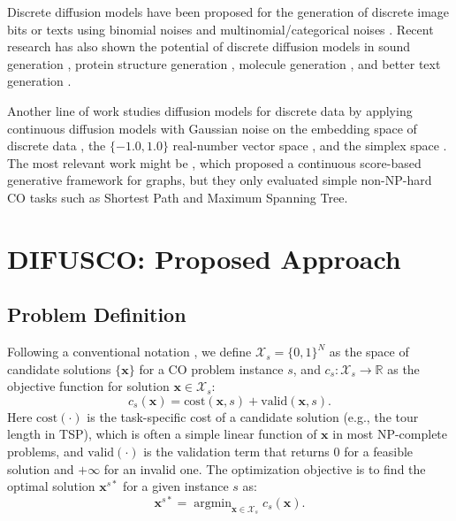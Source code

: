 \documentclass{article}
\theoremstyle{plain}
\theoremstyle{definition}
\theoremstyle{remark}
\newcommand{\method}{DIFUSCO}
\DeclareMathOperator*{\argmin}{argmin}
\newcommand\CAL\mathcal
\begin{document}
Discrete diffusion models have been proposed for the generation of discrete image bits or texts using binomial noises \citep{sohl2015deep} and multinomial/categorical noises \citep{austin2021structured,hoogeboom2021argmax}.
Recent research has also shown the potential of discrete diffusion models in sound generation \citep{yang2022diffsound}, protein structure generation \citep{luo2022antigenspecific}, molecule generation \citep{vignac2022digress}, and better text generation \citep{johnson2021beyond,he2022diffusionbert}.

Another line of work studies diffusion models for discrete data by applying continuous diffusion models with Gaussian noise on the embedding space of discrete data \citep{gong2022diffuseq,li2022diffusionlm,dieleman2022continuous}, the $\{-1.0, 1.0\}$ real-number vector space \citep{chen2022analog}, and the simplex space \citep{han2022ssd}. The most relevant work might be \citet{niu2020permutation}, which proposed a continuous score-based generative framework for graphs, but they only evaluated simple non-NP-hard CO tasks such as Shortest Path and Maximum Spanning Tree.





\section{\method: Proposed Approach}


\subsection{Problem Definition}

Following a conventional notation \citep{papadimitriou1998combinatorial}, we define $\mathcal{X}_s = \{0, 1\}^N$ as the space of candidate solutions $\{\mathbf{x}\}$ 
for a CO problem instance $s$, and $c_s: \mathcal{X}_s \rightarrow \mathbb{R}$ as the 
objective function for solution $\mathbf{x} \in \mathcal{X}_s$:
\begin{equation}\label{eq:1}
    c_s(\mathbf{x}) = \mathrm{cost}(\mathbf{x}, s) + \mathrm{valid}(\mathbf{x}, s).
\end{equation}
Here $\mathrm{cost}(\cdot)$ is the %
task-specific cost of a candidate solution (e.g., the tour length in TSP), which is often a simple linear function of $\mathbf{x}$ in most %
NP-complete problems, and %
$\mathrm{valid}(\cdot)$ is the %
validation term that returns $0$ for a feasible solution and $+\infty$ for an invalid one. The optimization objective is to find the optimal solution $\mathbf{x}^{s*}$ for a given instance $s$ as:
\begin{equation}
    \mathbf{x}^{s*}=\argmin_{\mathbf{x}\in\CAL X_s} c_s(\mathbf{x}).
\end{equation}
\end{document}
